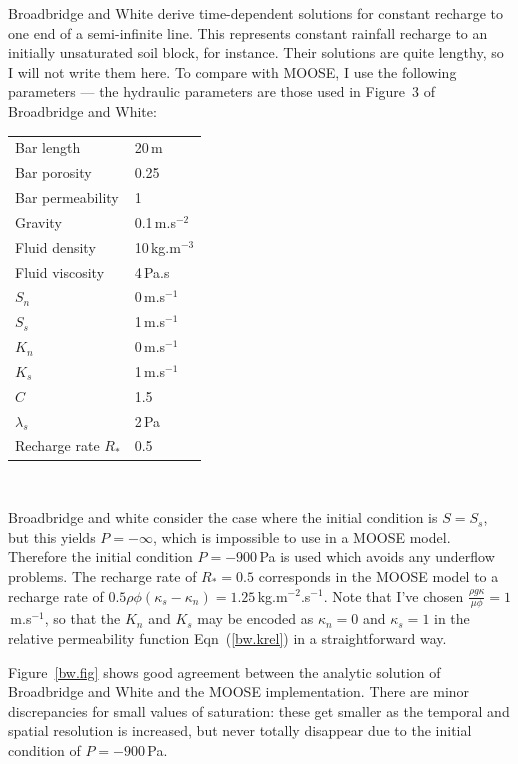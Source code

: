 \documentclass[]{scrreprt}
\begin{document}
Broadbridge and White derive time-dependent solutions for constant
recharge to one end of a semi-infinite line.  This represents constant
rainfall recharge to an initially unsaturated soil block, for
instance.  Their solutions are quite lengthy, so I will not write them
here.  To compare with MOOSE, I use the following parameters --- the
hydraulic parameters are those used in Figure~3 of Broadbridge and
White:
\begin{center}
\begin{tabular}{|ll|}
\hline
Bar length & 20\,m \\
Bar porosity & 0.25 \\
Bar permeability & 1 \\
\hline
Gravity & 0.1\,m.s$^{-2}$ \\
\hline
Fluid density & 10\,kg.m$^{-3}$ \\
Fluid viscosity & 4\,Pa.s \\
\hline
$S_{n}$ & 0\,m.s$^{-1}$ \\
$S_{s}$ & 1\,m.s$^{-1}$ \\
$K_{n}$ & 0\,m.s$^{-1}$ \\
$K_{s}$ & 1\,m.s$^{-1}$ \\
$C$ & 1.5 \\
$\lambda_{s}$ & 2\,Pa \\
\hline
Recharge rate $R_{\ast}$ & 0.5 \\
\hline
\end{tabular} \\
\end{center}
Broadbridge and white consider the case where the initial condition is
$S=S_{s}$, but this yields $P=-\infty$, which is impossible to use in
a MOOSE model.  Therefore the initial condition $P=-900$\,Pa is used
which avoids any underflow problems.  The recharge rate of
$R_{\ast}=0.5$ corresponds in the MOOSE model to a recharge rate of
$0.5\rho\phi(\kappa_{s}-\kappa_{n})=1.25$\,kg.m$^{-2}$.s$^{-1}$.  Note
that I've chosen $\frac{\rho g \kappa}{\mu \phi} = 1$\,m.s$^{-1}$, so
that the $K_{n}$ and $K_{s}$ may be encoded as $\kappa_{n}=0$ and
$\kappa_{s}=1$ in the relative permeability function
Eqn~(\ref{bw.krel}) in a straightforward way.

Figure~\ref{bw.fig} shows good agreement between the analytic solution
of Broadbridge and White and the MOOSE implementation.  There are
minor discrepancies for small values of saturation: these get smaller
as the temporal and spatial resolution is increased, but never totally
disappear due to the initial condition of $P=-900$\,Pa.
\end{document}
